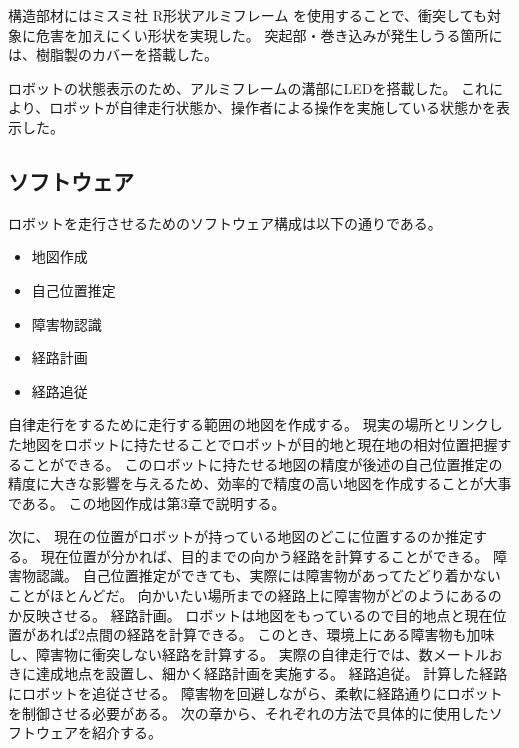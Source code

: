 構造部材にはミスミ社 R形状アルミフレーム を使用することで、衝突しても対象に危害を加えにくい形状を実現した。
突起部・巻き込みが発生しうる箇所には、樹脂製のカバーを搭載した。

ロボットの状態表示のため、アルミフレームの溝部にLEDを搭載した。
これにより、ロボットが自律走行状態か、操作者による操作を実施している状態かを表示した。

\subsection{ソフトウェア}
ロボットを走行させるためのソフトウェア構成は以下の通りである。
\begin{itemize}
    \item 地図作成
    \item 自己位置推定
    \item 障害物認識
    \item 経路計画
    \item 経路追従
\end{itemize}

自律走行をするために走行する範囲の地図を作成する。
現実の場所とリンクした地図をロボットに持たせることでロボットが目的地と現在地の相対位置把握することができる。
このロボットに持たせる地図の精度が後述の自己位置推定の精度に大きな影響を与えるため、効率的で精度の高い地図を作成することが大事である。
この地図作成は第3章で説明する。

次に、
現在の位置がロボットが持っている地図のどこに位置するのか推定する。
現在位置が分かれば、目的までの向かう経路を計算することができる。
障害物認識。
自己位置推定ができても、実際には障害物があってたどり着かないことがほとんどだ。
向かいたい場所までの経路上に障害物がどのようにあるのか反映させる。
経路計画。
ロボットは地図をもっているので目的地点と現在位置があれば2点間の経路を計算できる。
このとき、環境上にある障害物も加味し、障害物に衝突しない経路を計算する。
実際の自律走行では、数メートルおきに達成地点を設置し、細かく経路計画を実施する。
経路追従。
計算した経路にロボットを追従させる。
障害物を回避しながら、柔軟に経路通りにロボットを制御させる必要がある。
次の章から、それぞれの方法で具体的に使用したソフトウェアを紹介する。